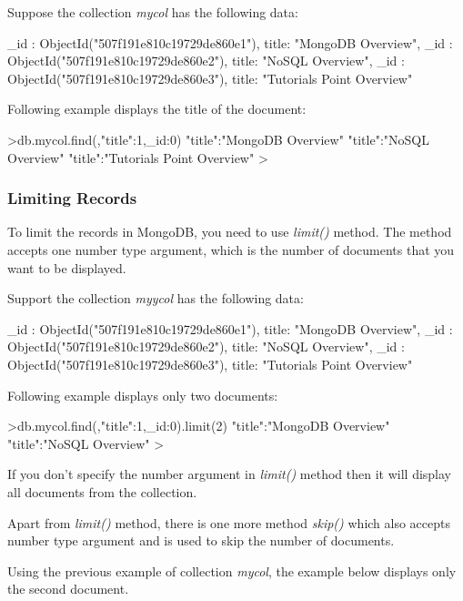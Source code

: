 \documentclass[12pt]{article}
\begin{document}
\begin{bashcode}
\begin{bashcode}
Suppose the collection \emph{mycol} has the following data:

\begin{javascriptcode}
{_id : ObjectId("507f191e810c19729de860e1"), title: "MongoDB Overview"},
{_id : ObjectId("507f191e810c19729de860e2"), title: "NoSQL Overview"},
{_id : ObjectId("507f191e810c19729de860e3"), title: "Tutorials Point Overview"}
\end{javascriptcode}

Following example displays the title of the document:

\begin{bashcode}
>db.mycol.find({},{"title":1,_id:0})
{"title":"MongoDB Overview"}
{"title":"NoSQL Overview"}
{"title":"Tutorials Point Overview"}
>
\end{bashcode}

\subsubsection{Limiting Records}
To limit the records in MongoDB, you need to use \emph{limit()} method. The
method accepts one number type argument, which is the number of
documents that you want to be displayed.

Support the collection \emph{myycol} has the following data:

\begin{javascriptcode}
{_id : ObjectId("507f191e810c19729de860e1"), title: "MongoDB Overview"},
{_id : ObjectId("507f191e810c19729de860e2"), title: "NoSQL Overview"},
{_id : ObjectId("507f191e810c19729de860e3"), title: "Tutorials Point Overview"}
\end{javascriptcode}

Following example displays only two documents:

\begin{bashcode}
>db.mycol.find({},{"title":1,_id:0}).limit(2)
{"title":"MongoDB Overview"}
{"title":"NoSQL Overview"}
>
\end{bashcode}

If you don't specify the number argument in \emph{limit()} method then it will
display all documents from the collection.

Apart from \emph{limit()} method, there is one more method \emph{skip()}
which also accepts number type argument and is used to skip the number
of documents.

Using the previous example of collection \emph{mycol},
the example below displays only the second document.


\end{bashcode}
\end{bashcode}
\end{document}

